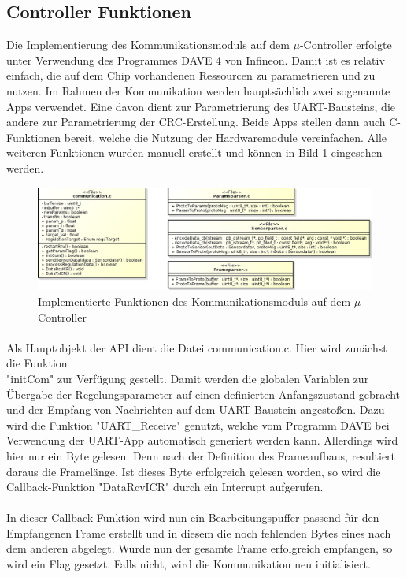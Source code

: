 \subsection{Controller Funktionen}
Die Implementierung des Kommunikationsmoduls auf dem $\mu$-Controller erfolgte unter Verwendung des Programmes DAVE 4 von Infineon. Damit ist es relativ einfach, die auf dem Chip vorhandenen Ressourcen zu parametrieren und zu nutzen. Im Rahmen der Kommunikation werden hauptsächlich zwei sogenannte Apps verwendet. Eine davon dient zur Parametrierung des UART-Bausteins, die andere zur Parametrierung der CRC-Erstellung. Beide Apps stellen dann auch C-Funktionen bereit, welche die Nutzung der Hardwaremodule vereinfachen. Alle weiteren Funktionen wurden manuell erstellt und können in Bild \ref{fig:xmcobj} eingesehen werden.
\begin{figure}
  \includegraphics[width=\textwidth]{XMCObjects}
  \caption{Implementierte Funktionen des Kommunikationsmoduls auf dem $\mu$-Controller}
  \label{fig:xmcobj}
\end{figure}
\paragraph{}
Als Hauptobjekt der API dient die Datei communication.c. Hier wird zunächst die Funktion \\"initCom" zur Verfügung gestellt. Damit werden die globalen Variablen zur Übergabe der Regelungsparameter auf einen definierten Anfangszustand gebracht und der Empfang von Nachrichten auf dem UART-Baustein angestoßen. Dazu wird die Funktion "UART\_Receive" genutzt, welche vom Programm DAVE bei Verwendung der UART-App automatisch generiert werden kann. Allerdings wird hier nur ein Byte gelesen. Denn nach der Definition des Frameaufbaus, resultiert daraus die Framelänge. Ist dieses Byte erfolgreich gelesen worden, so wird die Callback-Funktion "DataRcvICR" durch ein Interrupt aufgerufen.
\paragraph{}
In dieser Callback-Funktion wird nun ein Bearbeitungspuffer passend für den Empfangenen Frame erstellt und in diesem die noch fehlenden Bytes eines nach dem anderen abgelegt. Wurde nun der gesamte Frame erfolgreich empfangen, so wird ein Flag gesetzt. Falls nicht, wird die Kommunikation neu initialisiert.

